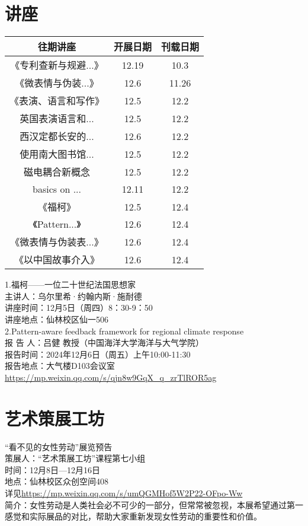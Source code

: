 \documentclass[letterpaper, 12pt]{article}
\begin{document}
\begin{multicols}{2}

\section{讲座}
\begin{tabular}{|c|c|c|}
    \hline
    往期讲座 & 开展日期 & 刊载日期\\
    \hline\hline
    《专利查新与规避...》 & 12.19 & 10.3\\
    《微表情与伪装...》 & 12.6 & 11.26\\
    《表演、语言和写作》 & 12.5 & 12.2\\
    英国表演语言和... & 12.5 & 12.2\\
    西汉定都长安的... & 12.6 & 12.2\\
    使用南大图书馆... & 12.5 & 12.2\\
    磁电耦合新概念 & 12.5 & 12.2\\
    basics on ... & 12.11 & 12.2\\
    《福柯》 & 12.5 & 12.4\\
    《Pattern...》 & 12.6 & 12.4\\
    《微表情与伪装表...》 & 12.6 & 12.4\\
    《以中国故事介入》 & 12.6 & 12.4\\
    \hline
\end{tabular}

1.福柯——一位二十世纪法国思想家\\
主讲人：乌尔里希·约翰内斯·施耐德\\
讲座时间：12月5日（周四）8：30-9：50\\
讲座地点：仙林校区仙一506\\

2.Pattern-aware feedback framework for regional climate response\\
报 告 人：吕健 教授（中国海洋大学海洋与大气学院）\\
报告时间：2024年12月6日（周五）上午10:00-11:30\\
报告地点：大气楼D103会议室\\
\url{https://mp.weixin.qq.com/s/qjn8w9GqX_q_zrTlROR5ag}\\

\section{艺术策展工坊}
“看不见的女性劳动”展览预告\\
策展人：“艺术策展工坊”课程第七小组\\
时间：12月8日—12月16日\\
地点：仙林校区众创空间408\\
详见\url{https://mp.weixin.qq.com/s/umQGMHof5W2P22-OFpo-Ww}\\
简介：女性劳动是人类社会必不可少的一部分，但常常被忽视，本展希望通过第一感觉和实际展品的对比，帮助大家重新发现女性劳动的重要性和价值。\\

\end{multicols}
\end{document}
